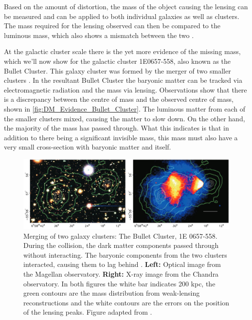 \par
Based on the amount of distortion, the mass of the object causing the lensing can be measured and can be applied to both individual galaxies as well as clusters.
The mass required for the lensing observed can then be compared to the luminous mass, which also shows a mismatch between the two \cite{History_Of_Dark_Matter_2018_ref}.


\par
At the galactic cluster scale there is the yet more evidence of the missing mass, which we'll now show for the galactic cluster 1E0657-558, also known as the Bullet Cluster.
This galaxy cluster was formed by the merger of two smaller clusters \cite{bullet_cluster_ref}.
In the resultant Bullet Cluster the baryonic matter can be tracked via electromagnetic radiation and the mass via lensing.
Observations show that there is a discrepancy between the centre of mass and the observed centre of mass, shown in \autoref{fig:DM_Evidence_Bullet_Cluster}.
The luminous matter from each of the smaller clusters mixed, causing the matter to slow down.
On the other hand, the majority of the mass has passed through.
What this indicates is that in addition to there being a significant invisible mass, this mass must also have a very small cross-section with baryonic matter and itself.

\begin{figure}[!htbp]%
    \centering
     \includegraphics[width=\textwidth]{Figures/DarkMatterEvidence/bullet_cluster_2.png}
    \caption[Merging of two galaxy cluster, 1E 0657-558]{Merging of two galaxy clusters: The Bullet Cluster, 1E 0657-558.
             During the collision, the dark matter components passed through without interacting.
             The baryonic components from the two clusters interacted, causing them to lag behind .
             \textbf{Left:} Optical image from the Magellan observatory.
             \textbf{Right:} X-ray image from the Chandra observatory.
             In both figures the white bar indicates 200 kpc, the green contours are the mass distribution from weak-lensing reconstructions and the white contours are the errors on the position of the lensing peaks.
             Figure adapted from \cite{bullet_cluster_ref}.}
    \label{fig:DM_Evidence_Bullet_Cluster}
\end{figure}


